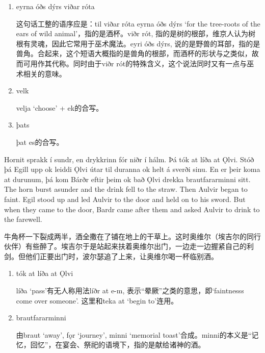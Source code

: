 \begin{grammar*}{}
    \begin{enumerate}[leftmargin=*]
        \item eyrna óðs dýrs viðar róta

              这句话工整的语序应是：til viðar róta eyrna óðs dýrs `for the tree-roots of the ears of wild animal'，指的是酒杯。viðr rót, 指的是树的根部，维京人认为树根有灵魂，因此它常用于巫术魔法。eyri óðs dýrs, 说的是野兽的耳部，指的是兽角。合起来，这个短语大概指的是兽角的根部，而酒杯的形状与之类似，故而可用作其代称。同时由于viðr rót的特殊含义，这个说法同时又有一点与巫术相关的意味。

        \item velk

              velja `choose' + ek的合写。
        \item þats

              þat es的合写。

    \end{enumerate}
\end{grammar*}
\begin{paracol}{2}
    Hornit sprakk í sundr, en drykkrinn fór niðr í hálm. Þá tók at líða at Ǫlvi. Stóð þá Egill upp ok leiddi Ǫlvi útar til duranna ok helt á sverði sinu. En er þeir koma at durunum, þá kom Bárðr eftir þeim ok bað Ǫlvi drekka brautfararminni sitt.
    \switchcolumn
    The horn burst asunder and the drink fell to the straw. Then Aulvir began to faint. Egil stood up and led Aulvir to the door and held on to his sword. But when they came to the door, Bardr came after them and asked Aulvir to drink to the farewell.
\end{paracol}
\begin{translation*}{}
    牛角杯一下裂成两半，酒全撒在了铺在地上的干草上。这时奥维尔（埃吉尔的同行伙伴）有些醉了。埃吉尔于是站起来扶着奥维尔出门，一边走一边握紧自己的利剑。但他们正要出门时，波尔瑟追了上来，让奥维尔喝一杯临别酒。
\end{translation*}
\begin{grammar*}{}
    \begin{enumerate}[leftmargin=*]
        \item tók at líða at Ǫlvi

              líða `pass'有无人称用法líðr at e-m, 表示“晕厥”之类的意思，即`faintnesss come over someone'. 这里和teka at `begin to'连用。

        \item brautfararminni

              由braut `away', fǫr `journey', minni `memorial toast'合成。minni的本义是“记忆，回忆”，在宴会、祭祀的语境下，指的是献给诸神的酒。
    \end{enumerate}
\end{grammar*}
